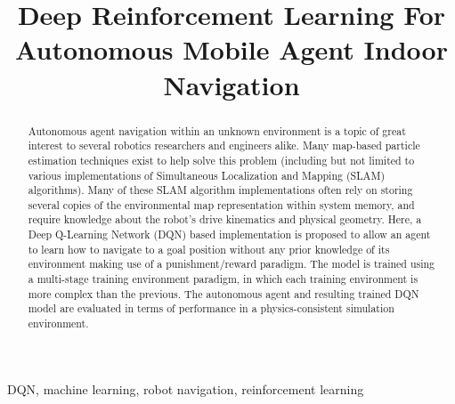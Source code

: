 \documentclass[conference]{IEEEtran}
\begin{document}
\title{Deep Reinforcement Learning For Autonomous Mobile Agent Indoor Navigation}

\author{
}

\maketitle

\begin{abstract}
    Autonomous agent navigation within an unknown environment is a topic of great interest to several robotics researchers and engineers alike. Many map-based particle estimation techniques exist to help solve this problem (including but not limited to various implementations of Simultaneous Localization and Mapping (SLAM) algorithms). Many of these SLAM algorithm implementations often rely on storing several copies of the environmental map representation within system memory, and require knowledge about the robot's drive kinematics and physical geometry. Here, a Deep Q-Learning Network (DQN) based implementation is proposed to allow an agent to learn how to navigate to a goal position without any prior knowledge of its environment making use of a punishment/reward paradigm. The model is trained using a multi-stage training environment paradigm, in which each training environment is more complex than the previous. The autonomous agent and resulting trained DQN model are evaluated in terms of performance in a physics-consistent simulation environment. 
\end{abstract}

\begin{IEEEkeywords}
DQN, machine learning, robot navigation, reinforcement learning
\end{IEEEkeywords}
\end{document}
